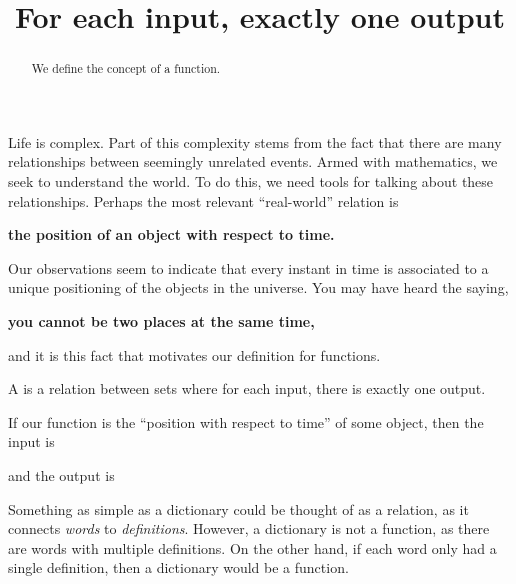 \documentclass{ximera}
\title{For each input, exactly one output}
\begin{document}
\begin{abstract}
  We define the concept of a function.
\end{abstract}

\maketitle

Life is complex. Part of this complexity stems from the fact that
there are many relationships between seemingly unrelated events. Armed
with mathematics, we seek to understand the world. To do this, we need
tools for talking about these relationships. Perhaps the most relevant
``real-world'' relation is
\begin{center}
  \textbf{the position of an object with respect to time.}
\end{center}
Our observations seem to indicate that every instant in time is
associated to a unique positioning of the objects in the universe.  You
may have heard the saying,
\begin{center}
  \textbf{you cannot be two places at the same time,}
\end{center}
and it is this fact that motivates our definition for functions.

\begin{definition}
A  is a relation between sets where for each input,
there is exactly one output.
\end{definition}

\begin{question}
  If our function is the ``position with respect to time'' of some
  object, then the input is
  \begin{multipleChoice}
  \end{multipleChoice}
  and the output is
  \begin{multipleChoice}
  \end{multipleChoice}
\end{question}


Something as simple as a dictionary could be thought of as a relation,
as it connects \textit{words} to \textit{definitions}. However, a
dictionary is not a function, as there are words with multiple
definitions. On the other hand, if each word only had a single
definition, then a dictionary would be a function.
\end{document}
